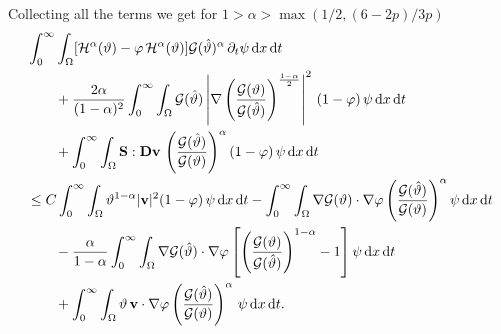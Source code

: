 \documentclass[11pt, a4paper, reqno]{amsart}
\numberwithin{equation}{section}
\newcommand{\dert}{\partial_t}
\newcommand{\thetah}{\hat\thet}
\newcommand{\vc}[1]{{\bf #1}}
\newcommand{\vv}{\vc{v}}
\newcommand{\thet}{\vartheta}
\renewcommand{\S}{\mathbf{S}}
\newcommand{\D}{\mathbf{D}}
\newcommand{\dt}{\,{\rm d} t }
\newcommand{\dx}{\,{\rm d} {x}}
\newcommand{\G}{\mathcal{G}}
\newcommand{\al}{\alpha}
\newcommand{\intnO}[1]{\int_0^{\infty}\intO{ #1 }\dt}
\newcommand{\intO}[1]{\int_{\Omega} #1 \dx}
\begin{document}
Collecting all the terms we get for $1>\alpha>\max(1/2,(6-2p)/3p)$
\begin{equation}\label{En-Final}
\begin{split}
& \intnO{[\mathcal{H}^\al(\thet) - \varphi\,\mathcal{H}^\al(\thet)]\G(\thetah)^{\al}\, \dert\psi}\\
&\qquad +\frac{2\al}{(1-\al)^2}\intnO{ \G(\thetah) \left|\nabla\left(\frac{\G(\thet)}{\G(\thetah)}\right)^{\frac{1-\al}{2}}\right|^2 \,(1-\varphi)\,\psi} \\
&\qquad + \intnO{  \S:\D{\vv}\,  \left(\frac{\G(\thetah)}{\G(\thet)}\right)^{\al} (1- \varphi)\,\psi}\\
&\leq
C\intnO{\thet^{1-\al}|\vv|^2 (1-\varphi)\,\psi} -\intnO{\nabla \G(\thet)\cdot \nabla\varphi  \left(\frac{\G(\thetah)}{\G(\thet)}\right)^{\al} \psi}\\
&\qquad 
-\frac{\alpha}{1-\alpha}\intnO{\nabla \G(\thetah)\cdot \nabla\varphi  \left[\left(\frac{\G(\thet)}{\G(\thetah)}\right)^{1-\al}-1\right] \psi} \\
&\qquad + \intnO{\thet\,\vv  \cdot \nabla\varphi\left(\frac{\G(\thetah)}{\G(\thet)}\right)^{\al} \,\psi } .
\end{split}\end{equation}
\end{document}
